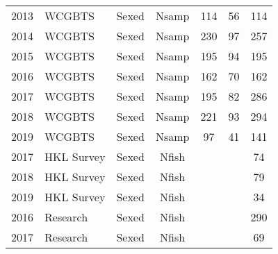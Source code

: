\begin{longtable}[t]{c>{\centering\arraybackslash}p{3cm}ccccc}
2013 & WCGBTS & Sexed & Nsamp & 114 & 56 & 114\\
2014 & WCGBTS & Sexed & Nsamp & 230 & 97 & 257\\
2015 & WCGBTS & Sexed & Nsamp & 195 & 94 & 195\\
2016 & WCGBTS & Sexed & Nsamp & 162 & 70 & 162\\
2017 & WCGBTS & Sexed & Nsamp & 195 & 82 & 286\\
2018 & WCGBTS & Sexed & Nsamp & 221 & 93 & 294\\
2019 & WCGBTS & Sexed & Nsamp & 97 & 41 & 141\\
2017 & HKL Survey & Sexed & Nfish &  &  & 74\\
2018 & HKL Survey & Sexed & Nfish &  &  & 79\\
2019 & HKL Survey & Sexed & Nfish &  &  & 34\\
2016 & Research & Sexed & Nfish &  &  & 290\\
2017 & Research & Sexed & Nfish &  &  & 69\\*
\end{longtable}
\endgroup{}
\endgroup{}
